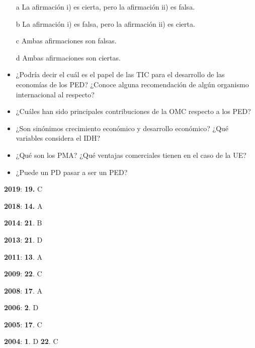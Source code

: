 \documentclass{nuevotema}
\begin{document}
\begin{enumerate}
	\item[a] La afirmación i) es cierta, pero la afirmación ii) es falsa.
	\item[b] La afirmación i) es falsa, pero la afirmación ii) es cierta.
	\item[c] Ambas afirmaciones son falsas.
	\item[d] Ambas afirmaciones son ciertas.
\end{enumerate}


\begin{itemize}
    \item ¿Podría decir el cuál es el papel de las TIC para el desarrollo de las economías de los PED? ¿Conoce alguna recomendación de algún organismo internacional al respecto?

    \item ¿Cuáles han sido principales contribuciones de la OMC respecto a los PED?

    \item ¿Son sinónimos crecimiento económico y desarrollo económico? ¿Qué variables considera el IDH?

    \item ¿Qué son los PMA? ¿Qué ventajas comerciales tienen en el caso de la UE?

    \item ¿Puede un PD pasar a ser un PED?
\end{itemize}

\notas

\textbf{2019}: \textbf{19.} C

\textbf{2018}: \textbf{14.} A

\textbf{2014}: \textbf{21}. B

\textbf{2013}: \textbf{21}. D

\textbf{2011}: \textbf{13}. A

\textbf{2009}: \textbf{22}. C

\textbf{2008}: \textbf{17}. A

\textbf{2006}: \textbf{2}. D

\textbf{2005}: \textbf{17}. C

\textbf{2004}: \textbf{1}. D \textbf{22}. C

\bibliografia
\end{document}
